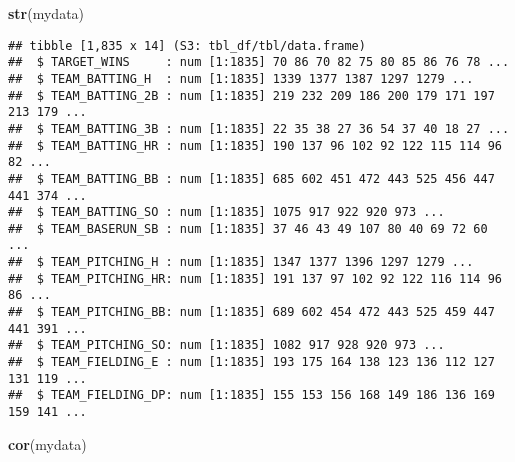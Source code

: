 \documentclass[
]{article}
\newenvironment{Shaded}{\begin{snugshade}}{\end{snugshade}}
\newcommand{\KeywordTok}[1]{\textcolor[rgb]{0.13,0.29,0.53}{\textbf{#1}}}
\newcommand{\NormalTok}[1]{#1}
\begin{document}
\begin{Shaded}
\begin{Highlighting}[]
\KeywordTok{str}\NormalTok{(mydata)}
\end{Highlighting}
\end{Shaded}

\begin{verbatim}
## tibble [1,835 x 14] (S3: tbl_df/tbl/data.frame)
##  $ TARGET_WINS     : num [1:1835] 70 86 70 82 75 80 85 86 76 78 ...
##  $ TEAM_BATTING_H  : num [1:1835] 1339 1377 1387 1297 1279 ...
##  $ TEAM_BATTING_2B : num [1:1835] 219 232 209 186 200 179 171 197 213 179 ...
##  $ TEAM_BATTING_3B : num [1:1835] 22 35 38 27 36 54 37 40 18 27 ...
##  $ TEAM_BATTING_HR : num [1:1835] 190 137 96 102 92 122 115 114 96 82 ...
##  $ TEAM_BATTING_BB : num [1:1835] 685 602 451 472 443 525 456 447 441 374 ...
##  $ TEAM_BATTING_SO : num [1:1835] 1075 917 922 920 973 ...
##  $ TEAM_BASERUN_SB : num [1:1835] 37 46 43 49 107 80 40 69 72 60 ...
##  $ TEAM_PITCHING_H : num [1:1835] 1347 1377 1396 1297 1279 ...
##  $ TEAM_PITCHING_HR: num [1:1835] 191 137 97 102 92 122 116 114 96 86 ...
##  $ TEAM_PITCHING_BB: num [1:1835] 689 602 454 472 443 525 459 447 441 391 ...
##  $ TEAM_PITCHING_SO: num [1:1835] 1082 917 928 920 973 ...
##  $ TEAM_FIELDING_E : num [1:1835] 193 175 164 138 123 136 112 127 131 119 ...
##  $ TEAM_FIELDING_DP: num [1:1835] 155 153 156 168 149 186 136 169 159 141 ...
\end{verbatim}

\begin{Shaded}
\begin{Highlighting}[]
\KeywordTok{cor}\NormalTok{(mydata)}
\end{Highlighting}
\end{Shaded}
\end{document}
